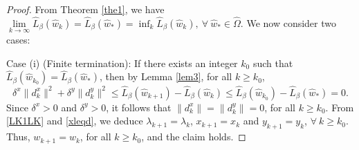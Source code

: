 \documentclass[pdflatex,sn-mathphys-num]{sn-jnl}%
\theoremstyle{thmstyleone}%
\theoremstyle{thmstyletwo}%
\theoremstyle{thmstylethree}%
\begin{document}
\begin{proof} From Theorem \ref{the1}, we have $\lim\limits_{k \to \infty} \hat{L}_{\beta}(\hat{w}_{k})=\hat{L}_{\beta}(\hat{w}_{*})=\inf_{k} \hat{L}_{\beta}(\hat{w}_{k}),~\forall~\hat{w}_{*}\in \hat{\Omega}$.
We now consider two cases:

Case (i) (Finite termination): If there exists an integer $k_0$ such that $\hat{L}_{\beta}(\hat{w}_{k_0})=\hat{L}_{\beta}(\hat{w}_{*})$, then by Lemma \ref{lem3}, for all $k\geq k_0$,
\[
\delta^x\|d_{k}^x\|^2+\delta^y\|d_{k}^y\|^2
\leq \hat{L}_{\beta}(\hat{w}_{k+1})-\hat{L}_{\beta}(\hat{w}_{k}) \leq \hat{L}_{\beta}(\hat{w}_{k_0})-\hat{L}_{\beta}(\hat{w}_{*})=0.
\]
Since $\delta^x>0$ and $\delta^y>0$, it follows that $\|d_{k}^x\|=\|d_{k}^y\|=0$, for all $k\geq k_0$. From \eqref{LK1LK} and \eqref{xleqd}, we deduce ${\lambda}_{k+1}=\lambda_{k}$, ${x}_{k+1}=x_{k}$ and ${y}_{k+1}=y_{k}$, $\forall\ k\geq k_0$. Thus, ${w}_{k+1}=w_{k}$, for all $k\geq k_0$, and the claim holds.


\end{proof}
\end{document}
